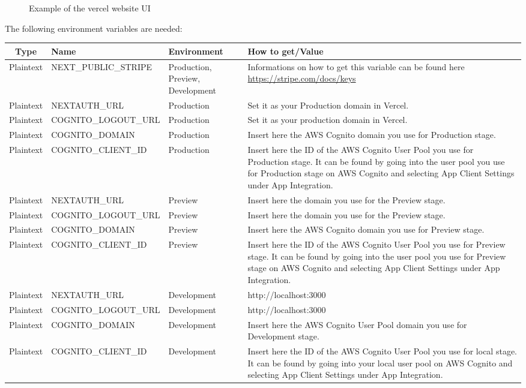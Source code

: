 \begin{enumerate}
\begin{figure}[H]
\caption{Example of the vercel website UI}
\end{figure}
The following environment variables are needed:\\
\setcounter{table}{-1}
{
\centering
\renewcommand{\arraystretch}{1.5}
\begin{longtable}{c C{6cm} C{3cm} C{5cm}}
\textbf{Type} &
\textbf{Name} &
\textbf{Environment} &
\textbf{How to get/Value}\\
\endhead

Plaintext & NEXT\_PUBLIC\_STRIPE & Production, Preview, Development & Informations on how to get this variable can be found here \url{https://stripe.com/docs/keys}\\
Plaintext & NEXTAUTH\_URL & Production & Set it as your Production domain in Vercel.\\
Plaintext & COGNITO\_LOGOUT\_URL & Production & Set it as your production domain in Vercel.\\
Plaintext & COGNITO\_DOMAIN & Production & Insert here the AWS Cognito domain you use for Production stage.\\
Plaintext & COGNITO\_CLIENT\_ID & Production & Insert here the ID of the AWS Cognito User Pool you use for Production stage. It can be found by going into the user pool you use for Production stage on AWS Cognito and selecting App Client Settings under App Integration.\\
Plaintext & NEXTAUTH\_URL & Preview & Insert here the domain you use for the Preview stage.\\
Plaintext & COGNITO\_LOGOUT\_URL & Preview & Insert here the domain you use for the Preview stage.\\
Plaintext & COGNITO\_DOMAIN & Preview & Insert here the AWS Cognito domain you use for Preview stage.\\
Plaintext & COGNITO\_CLIENT\_ID & Preview & Insert here the ID of the AWS Cognito User Pool you use for Preview stage. It can be found by going into the user pool you use for Preview stage on AWS Cognito and selecting App Client Settings under App Integration.\\
Plaintext & NEXTAUTH\_URL & Development & http://localhost:3000 \\
Plaintext & COGNITO\_LOGOUT\_URL & Development & http://localhost:3000 \\
Plaintext & COGNITO\_DOMAIN & Development & Insert here the AWS Cognito User Pool domain you use for Development stage.\\
Plaintext & COGNITO\_CLIENT\_ID & Development & Insert here the ID of the AWS Cognito User Pool you use for local stage. It can be found by going into your local user pool on AWS Cognito and selecting App Client Settings under App Integration.\\

\end{longtable}}
\end{enumerate}
